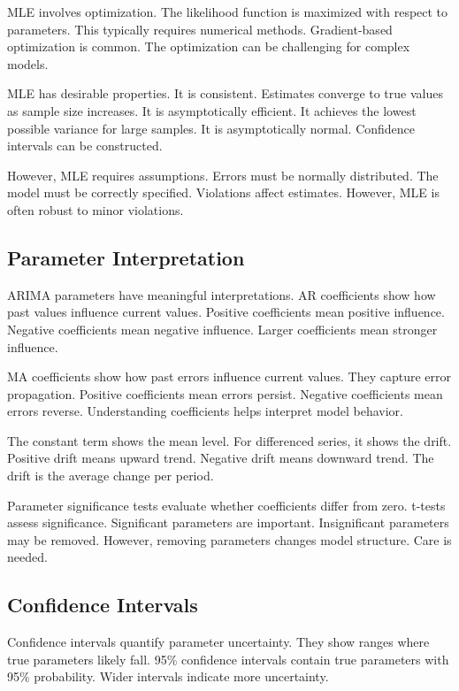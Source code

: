 MLE involves optimization. The likelihood function is maximized with respect to parameters. This typically requires numerical methods. Gradient-based optimization is common. The optimization can be challenging for complex models.

MLE has desirable properties. It is consistent. Estimates converge to true values as sample size increases. It is asymptotically efficient. It achieves the lowest possible variance for large samples. It is asymptotically normal. Confidence intervals can be constructed.

However, MLE requires assumptions. Errors must be normally distributed. The model must be correctly specified. Violations affect estimates. However, MLE is often robust to minor violations.

\subsection{Parameter Interpretation}

ARIMA parameters have meaningful interpretations. AR coefficients show how past values influence current values. Positive coefficients mean positive influence. Negative coefficients mean negative influence. Larger coefficients mean stronger influence.

MA coefficients show how past errors influence current values. They capture error propagation. Positive coefficients mean errors persist. Negative coefficients mean errors reverse. Understanding coefficients helps interpret model behavior.

The constant term shows the mean level. For differenced series, it shows the drift. Positive drift means upward trend. Negative drift means downward trend. The drift is the average change per period.

Parameter significance tests evaluate whether coefficients differ from zero. t-tests assess significance. Significant parameters are important. Insignificant parameters may be removed. However, removing parameters changes model structure. Care is needed.

\subsection{Confidence Intervals}

Confidence intervals quantify parameter uncertainty. They show ranges where true parameters likely fall. 95\% confidence intervals contain true parameters with 95\% probability. Wider intervals indicate more uncertainty.

